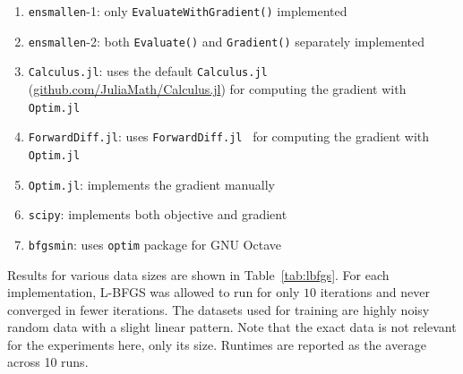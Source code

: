 \documentclass{article}
\begin{document}
\vspace*{-0.3em}
\begin{enumerate}[{~~~$\bullet$}]
\renewcommand{\itemsep}{-0.5ex}
  \item {\tt ensmallen}-1: only \texttt{\small EvaluateWithGradient()} implemented
  \item {\tt ensmallen}-2: both \texttt{\small Evaluate()} and \texttt{\small Gradient()} separately
implemented
  \item {\tt Calculus.jl}: uses the default {\tt Calculus.jl} (\href{https://github.com/JuliaMath/Calculus.jl}{\footnotesize github.com/JuliaMath/Calculus.jl}) for
computing the gradient with {\tt Optim.jl}
  \item {\tt ForwardDiff.jl}: uses {\tt ForwardDiff.jl}~\cite{RevelsLubinPapamarkou2016} for computing
the gradient with {\tt Optim.jl}
  \item {\tt Optim.jl}: implements the gradient manually
  \item {\tt scipy}: implements both objective and
gradient
  \item {\tt bfgsmin}: uses {\tt optim} package for GNU Octave
\end{enumerate}
\vspace*{-0.3em}



Results for various data sizes are shown in Table~\ref{tab:lbfgs}.  For each
implementation, L-BFGS was allowed to run for only $10$ iterations and never
converged in fewer iterations.  The datasets used for training are highly noisy random
data with a slight linear pattern. Note that the exact data is not relevant
for the experiments here, only its size.  Runtimes are reported as the
average across 10 runs.
\end{document}
